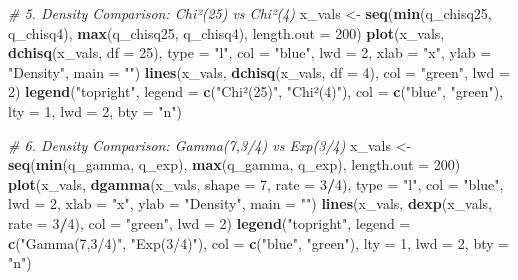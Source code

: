 \documentclass[
]{article}
\newenvironment{Shaded}{\begin{snugshade}}{\end{snugshade}}
\newcommand{\AttributeTok}[1]{\textcolor[rgb]{0.13,0.29,0.53}{#1}}
\newcommand{\CommentTok}[1]{\textcolor[rgb]{0.56,0.35,0.01}{\textit{#1}}}
\newcommand{\DecValTok}[1]{\textcolor[rgb]{0.00,0.00,0.81}{#1}}
\newcommand{\FunctionTok}[1]{\textcolor[rgb]{0.13,0.29,0.53}{\textbf{#1}}}
\newcommand{\NormalTok}[1]{#1}
\newcommand{\OtherTok}[1]{\textcolor[rgb]{0.56,0.35,0.01}{#1}}
\newcommand{\SpecialCharTok}[1]{\textcolor[rgb]{0.81,0.36,0.00}{\textbf{#1}}}
\newcommand{\StringTok}[1]{\textcolor[rgb]{0.31,0.60,0.02}{#1}}
\begin{document}
\begin{Shaded}
\begin{Highlighting}[]
\CommentTok{\# 5. Density Comparison: Chi²(25) vs Chi²(4)}
\NormalTok{x\_vals }\OtherTok{\textless{}{-}} \FunctionTok{seq}\NormalTok{(}\FunctionTok{min}\NormalTok{(q\_chisq25, q\_chisq4), }\FunctionTok{max}\NormalTok{(q\_chisq25, q\_chisq4), }\AttributeTok{length.out =} \DecValTok{200}\NormalTok{)}
\FunctionTok{plot}\NormalTok{(x\_vals, }\FunctionTok{dchisq}\NormalTok{(x\_vals, }\AttributeTok{df =} \DecValTok{25}\NormalTok{), }\AttributeTok{type =} \StringTok{"l"}\NormalTok{, }\AttributeTok{col =} \StringTok{"blue"}\NormalTok{, }\AttributeTok{lwd =} \DecValTok{2}\NormalTok{, }\AttributeTok{xlab =} \StringTok{"x"}\NormalTok{, }\AttributeTok{ylab =} \StringTok{"Density"}\NormalTok{, }\AttributeTok{main =} \StringTok{""}\NormalTok{)}
\FunctionTok{lines}\NormalTok{(x\_vals, }\FunctionTok{dchisq}\NormalTok{(x\_vals, }\AttributeTok{df =} \DecValTok{4}\NormalTok{), }\AttributeTok{col =} \StringTok{"green"}\NormalTok{, }\AttributeTok{lwd =} \DecValTok{2}\NormalTok{)}
\FunctionTok{legend}\NormalTok{(}\StringTok{"topright"}\NormalTok{, }\AttributeTok{legend =} \FunctionTok{c}\NormalTok{(}\StringTok{"Chi²(25)"}\NormalTok{, }\StringTok{"Chi²(4)"}\NormalTok{), }\AttributeTok{col =} \FunctionTok{c}\NormalTok{(}\StringTok{"blue"}\NormalTok{, }\StringTok{"green"}\NormalTok{), }\AttributeTok{lty =} \DecValTok{1}\NormalTok{, }\AttributeTok{lwd =} \DecValTok{2}\NormalTok{, }\AttributeTok{bty =} \StringTok{"n"}\NormalTok{)}

\CommentTok{\# 6. Density Comparison: Gamma(7,3/4) vs Exp(3/4)}
\NormalTok{x\_vals }\OtherTok{\textless{}{-}} \FunctionTok{seq}\NormalTok{(}\FunctionTok{min}\NormalTok{(q\_gamma, q\_exp), }\FunctionTok{max}\NormalTok{(q\_gamma, q\_exp), }\AttributeTok{length.out =} \DecValTok{200}\NormalTok{)}
\FunctionTok{plot}\NormalTok{(x\_vals, }\FunctionTok{dgamma}\NormalTok{(x\_vals, }\AttributeTok{shape =} \DecValTok{7}\NormalTok{, }\AttributeTok{rate =} \DecValTok{3}\SpecialCharTok{/}\DecValTok{4}\NormalTok{), }\AttributeTok{type =} \StringTok{"l"}\NormalTok{, }\AttributeTok{col =} \StringTok{"blue"}\NormalTok{, }\AttributeTok{lwd =} \DecValTok{2}\NormalTok{, }\AttributeTok{xlab =} \StringTok{"x"}\NormalTok{, }\AttributeTok{ylab =} \StringTok{"Density"}\NormalTok{, }\AttributeTok{main =} \StringTok{""}\NormalTok{)}
\FunctionTok{lines}\NormalTok{(x\_vals, }\FunctionTok{dexp}\NormalTok{(x\_vals, }\AttributeTok{rate =} \DecValTok{3}\SpecialCharTok{/}\DecValTok{4}\NormalTok{), }\AttributeTok{col =} \StringTok{"green"}\NormalTok{, }\AttributeTok{lwd =} \DecValTok{2}\NormalTok{)}
\FunctionTok{legend}\NormalTok{(}\StringTok{"topright"}\NormalTok{, }\AttributeTok{legend =} \FunctionTok{c}\NormalTok{(}\StringTok{"Gamma(7,3/4)"}\NormalTok{, }\StringTok{"Exp(3/4)"}\NormalTok{), }\AttributeTok{col =} \FunctionTok{c}\NormalTok{(}\StringTok{"blue"}\NormalTok{, }\StringTok{"green"}\NormalTok{), }\AttributeTok{lty =} \DecValTok{1}\NormalTok{, }\AttributeTok{lwd =} \DecValTok{2}\NormalTok{, }\AttributeTok{bty =} \StringTok{"n"}\NormalTok{)}


\end{Highlighting}
\end{Shaded}
\end{document}
